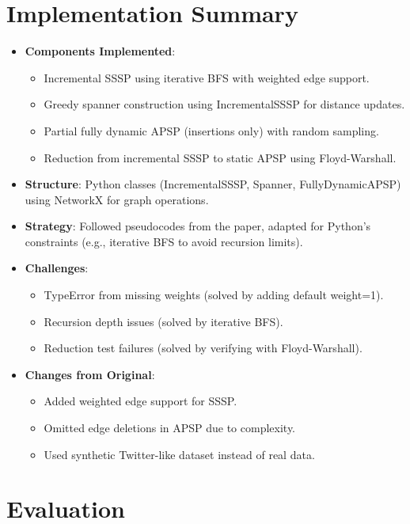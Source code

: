 \documentclass[11pt]{article}
\begin{document}
\section{Implementation Summary}
\begin{itemize}
    \item \textbf{Components Implemented}:
    \begin{itemize}
        \item Incremental SSSP using iterative BFS with weighted edge support.
        \item Greedy spanner construction using IncrementalSSSP for distance updates.
        \item Partial fully dynamic APSP (insertions only) with random sampling.
        \item Reduction from incremental SSSP to static APSP using Floyd-Warshall.
    \end{itemize}
    \item \textbf{Structure}: Python classes (IncrementalSSSP, Spanner, FullyDynamicAPSP) using NetworkX for graph operations.
    \item \textbf{Strategy}: Followed pseudocodes from the paper, adapted for Python’s constraints (e.g., iterative BFS to avoid recursion limits).
    \item \textbf{Challenges}:
    \begin{itemize}
        \item TypeError from missing weights (solved by adding default weight=1).
        \item Recursion depth issues (solved by iterative BFS).
        \item Reduction test failures (solved by verifying with Floyd-Warshall).
    \end{itemize}
    \item \textbf{Changes from Original}:
    \begin{itemize}
        \item Added weighted edge support for SSSP.
        \item Omitted edge deletions in APSP due to complexity.
        \item Used synthetic Twitter-like dataset instead of real data.
    \end{itemize}
\end{itemize}

\section{Evaluation}
\end{document}

